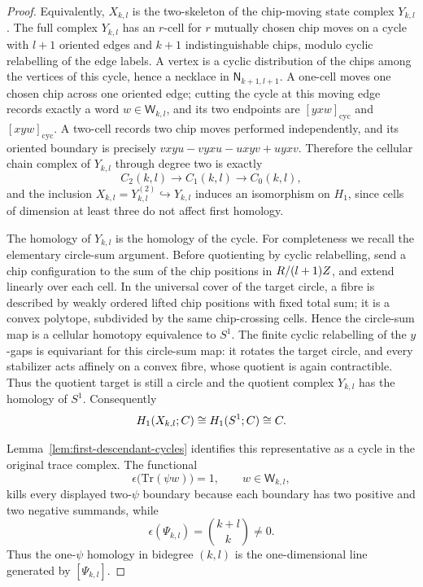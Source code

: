 \documentclass[11pt]{memoir}
\begin{document}
\begin{proof}
  Equivalently, $X_{k,l}$ is the two-skeleton of the chip-moving state complex
  $Y_{k,l}$. The full complex $Y_{k,l}$ has an $r$-cell for $r$ mutually chosen
  chip moves on a cycle with $l+1$ oriented edges and $k+1$ indistinguishable
  chips, modulo cyclic relabelling of the edge labels. A vertex is a cyclic
  distribution of the chips among the vertices of this cycle, hence a necklace
  in $\mathsf N_{k+1,l+1}$. A one-cell moves one chosen chip across one oriented
  edge; cutting the cycle at this moving edge records exactly a word
  $w\in\mathsf W_{k,l}$, and its two endpoints are
  $[yxw]_{\mathrm{cyc}}$ and $[xyw]_{\mathrm{cyc}}$. A two-cell records two chip
  moves performed independently, and its oriented boundary is precisely
  $vxyu-vyxu-uxyv+uyxv$. Therefore the cellular chain complex of $Y_{k,l}$
  through degree two is exactly
  $$C_2(k,l)\longrightarrow C_1(k,l)\longrightarrow C_0(k,l),$$
  and the inclusion $X_{k,l}=Y_{k,l}^{(2)}\hookrightarrow Y_{k,l}$ induces an
  isomorphism on $H_1$, since cells of dimension at least three do not affect
  first homology.

  The homology of $Y_{k,l}$ is the homology of the cycle. For completeness we
  recall the elementary circle-sum argument. Before quotienting by cyclic
  relabelling, send a chip configuration to the sum of the chip positions in
  $R/(l+1)Z$, and extend linearly over each cell. In the
  universal cover of the target circle, a fibre is described by weakly ordered
  lifted chip positions with fixed total sum; it is a convex polytope, subdivided
  by the same chip-crossing cells. Hence the circle-sum map is a cellular homotopy
  equivalence to $S^1$. The finite cyclic relabelling of the $y$-gaps is
  equivariant for this circle-sum map: it rotates the target circle, and every
  stabilizer acts affinely on a convex fibre, whose quotient is again
  contractible. Thus the quotient target is still a circle and the quotient
  complex $Y_{k,l}$ has the homology of $S^1$. Consequently
  $$H_1(X_{k,l};C)\cong H_1(S^1;C)\cong C.$$

  Lemma~\ref{lem:first-descendant-cycles} identifies this representative as a
  cycle in the original trace complex. The functional
  $$\epsilon\bigl(\mathrm{Tr}(\psi w)\bigr)=1,\qquad w\in\mathsf W_{k,l},$$
  kills every displayed two-$\psi$ boundary because each boundary has two
  positive and two negative summands, while
  $$\epsilon(\Psi_{k,l})=\binom{k+l}{k}\neq0.$$
  Thus the one-$\psi$ homology in bidegree $(k,l)$ is the one-dimensional line
  generated by $[\Psi_{k,l}]$.
\end{proof}
\end{document}
